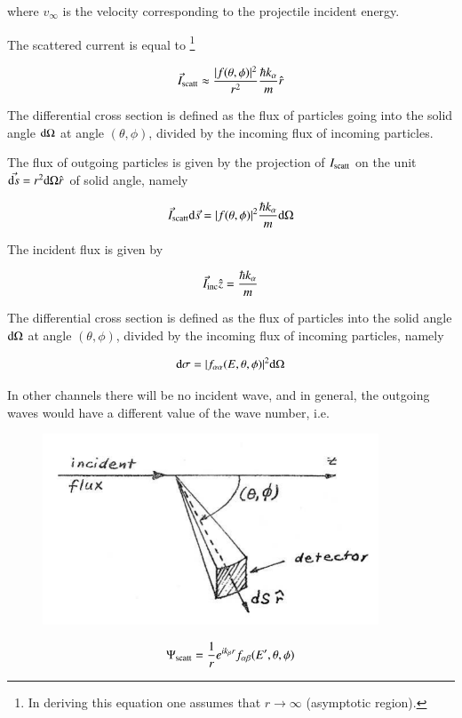 \documentclass[a4paper,14pt]{book}
\begin{document}
\noindent where $v_{\infty}$ is the velocity corresponding to the projectile incident energy.

The scattered current is equal to \footnote{In deriving this equation one assumes that $r \rightarrow \infty$ (asymptotic region).}

\begin{equation}
\vec{I}_{\rm scatt} \approx \frac{|f(\theta,\phi)|^2}{r^2} \frac{\hbar k_{\alpha}}{m} \hat{r}
\end{equation}

The differential cross section is defined as the flux of particles going into the solid angle ${\rm d}\Omega$ at angle $(\theta,\phi)$, divided by the incoming flux of incoming particles.

The flux of outgoing particles is given by the projection of $I_{\rm scatt}$ on the unit $\vec{{\rm d}s} = r^2 {\rm d}\Omega \hat{r}$ of solid angle, namely

\begin{equation}
\vec{I}_{\rm scatt} {\rm d}\vec{s} = |f(\theta,\phi)|^2 \frac{\hbar k_{\alpha}}{m} {\rm d}\Omega
\end{equation}

\noindent The incident flux is given by

\begin{equation}
\vec{I}_{\rm inc} \hat{z} = \frac{\hbar k_{\alpha}}{m}
\end{equation}

\noindent The differential cross section is defined as the flux of particles into the solid angle ${\rm d}\Omega$ at angle $(\theta,\phi)$, divided by the incoming flux of incoming particles, namely

\begin{equation}
{\rm d}\sigma = |f_{\alpha \alpha}(E,\theta,\phi)|^2 {\rm d}\Omega
\end{equation}

In other channels there will be no incident wave, and in general, the outgoing waves would have a different value of the wave number, i.e.

\begin{figure}
\centerline{\includegraphics*[width=10cm,angle=0]{figs_C2/1_2}}
\caption{}\label{fig1st_2}
\end{figure}
\begin{equation}
\Psi_{\rm scatt} = \frac{1}{r} e^{i k_{\beta} r} f_{\alpha \beta} (E',\theta,\phi)
\end{equation}
\end{document}
